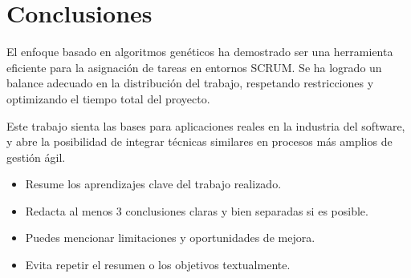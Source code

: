 \section{Conclusiones}

El enfoque basado en algoritmos genéticos ha demostrado ser una herramienta eficiente para la asignación de tareas en entornos SCRUM. Se ha logrado un balance adecuado en la distribución del trabajo, respetando restricciones y optimizando el tiempo total del proyecto.

Este trabajo sienta las bases para aplicaciones reales en la industria del software, y abre la posibilidad de integrar técnicas similares en procesos más amplios de gestión ágil.

\vspace{0.5cm}

\begin{tcolorbox}[colback=gray!10, colframe=black!30, title={Sugerencias para esta sección}]
    \begin{itemize}
        \item Resume los aprendizajes clave del trabajo realizado.
        \item Redacta al menos 3 conclusiones claras y bien separadas si es posible.
        \item Puedes mencionar limitaciones y oportunidades de mejora.
        \item Evita repetir el resumen o los objetivos textualmente.
    \end{itemize}
\end{tcolorbox}